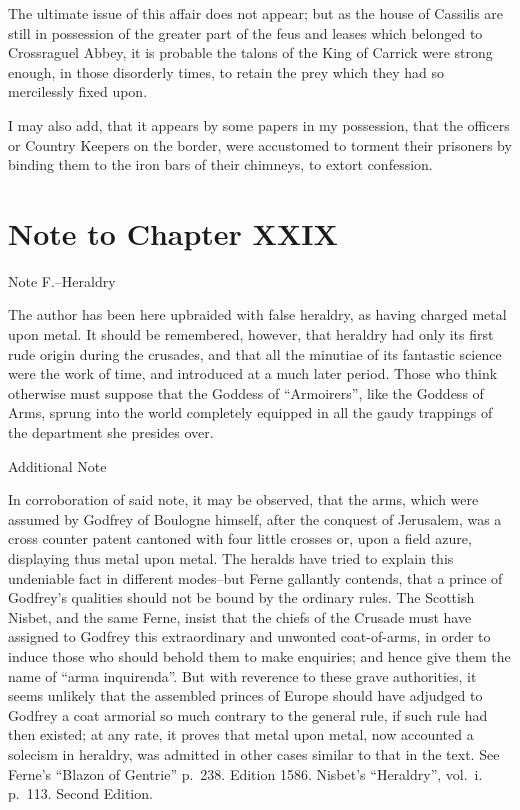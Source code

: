 The ultimate issue of this affair does not appear; but as the house of
Cassilis are still in possession of the greater part of the feus and
leases which belonged to Crossraguel Abbey, it is probable the talons of
the King of Carrick were strong enough, in those disorderly times, to
retain the prey which they had so mercilessly fixed upon.

I may also add, that it appears by some papers in my possession, that
the officers or Country Keepers on the border, were accustomed to
torment their prisoners by binding them to the iron bars of their
chimneys, to extort confession.

\section*{Note to Chapter XXIX}\label{noteCXXIX}

Note F.--Heraldry

The author has been here upbraided with false heraldry, as having
charged metal upon metal. It should be remembered, however, that
heraldry had only its first rude origin during the crusades, and that
all the minutiae of its fantastic science were the work of time, and
introduced at a much later period. Those who think otherwise must
suppose that the Goddess of ``Armoirers'', like the Goddess of Arms,
sprung into the world completely equipped in all the gaudy trappings of
the department she presides over.

Additional Note

In corroboration of said note, it may be observed, that the arms, which
were assumed by Godfrey of Boulogne himself, after the conquest of
Jerusalem, was a cross counter patent cantoned with four little crosses
or, upon a field azure, displaying thus metal upon metal. The heralds
have tried to explain this undeniable fact in different modes--but Ferne
gallantly contends, that a prince of Godfrey's qualities should not be
bound by the ordinary rules. The Scottish Nisbet, and the same Ferne,
insist that the chiefs of the Crusade must have assigned to Godfrey this
extraordinary and unwonted coat-of-arms, in order to induce those who
should behold them to make enquiries; and hence give them the name of
``arma inquirenda''. But with reverence to these grave authorities, it
seems unlikely that the assembled princes of Europe should have adjudged
to Godfrey a coat armorial so much contrary to the general rule, if such
rule had then existed; at any rate, it proves that metal upon metal, now
accounted a solecism in heraldry, was admitted in other cases similar to
that in the text. See Ferne's ``Blazon of Gentrie'' p.~238. Edition
1586. Nisbet's ``Heraldry'', vol.~i. p.~113. Second Edition.

